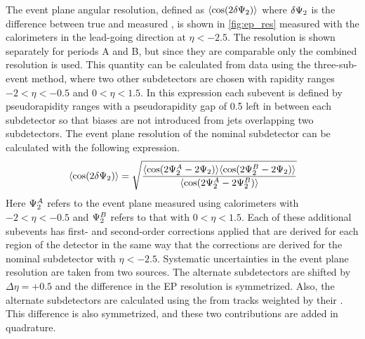 The event plane angular resolution, defined as $\langle \cos(2 \delta \Psi_{2}) \rangle$ where $\delta \Psi_{2}$ is the difference between true and measured \psit, is shown in \cref{fig:ep_res} measured with the calorimeters in the lead-going direction at $\eta < -2.5$.
The resolution is shown separately for periods A and B, but since they are comparable only the combined resolution is used.
This quantity can be calculated from data using the three-sub-event method, where two other subdetectors are chosen with rapidity ranges $-2 < \eta< -0.5$ and $0 < \eta < 1.5$.
In this expression each subevent is defined by pseudorapidity ranges with a pseudorapidity gap of 0.5 left in between each subdetector so that biases are not introduced from jets overlapping two subdetectors.
The event plane resolution of the nominal subdetector can be calculated with the following expression.
\begin{equation}
\langle \cos(2 \delta \Psi_{2}) \rangle = \sqrt{ \frac{\langle \cos(2\Psi_{2}^A - 2\Psi_{2}) \rangle \langle \cos(2\Psi_{2}^B - 2\Psi_{2}) \rangle }{\langle \cos(2\Psi_{2}^A - 2\Psi_{2}^B) \rangle} }\\
\end{equation}
Here $\Psi_{2}^A$ refers to the event plane measured using calorimeters with $-2 < \eta< -0.5$ and $\Psi_{2}^B$ refers to that with $0 < \eta < 1.5$.
Each of these additional subevents has first- and second-order corrections applied that are derived for each region of the detector in the same way that the corrections are derived for the nominal subdetector with $\eta < -2.5$.
Systematic uncertainties in the event plane resolution are taken from two sources.
The alternate subdetectors are shifted by $\Delta\eta = +0.5$ and the difference in the EP resolution is symmetrized.
Also, the alternate subdetectors are calculated using the \qt from tracks weighted by their \pt.
This difference is also symmetrized, and these two contributions are added in quadrature.

